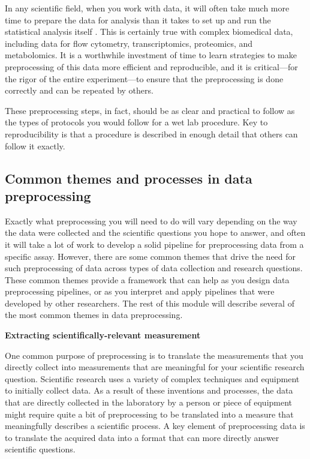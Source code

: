 \documentclass[]{tufte-book}
\begin{document}
In any scientific field, when you work with data, it will often take much more
time to prepare the data for analysis than it takes to set up and run the
statistical analysis itself \citep{robinson2014broom}. This is certainly true with
complex biomedical data, including data for flow cytometry, transcriptomics,
proteomics, and metabolomics. It is a worthwhile investment of time to learn
strategies to make preprocessing of this data more efficient and reproducible,
and it is critical---for the rigor of the entire experiment---to ensure that the
preprocessing is done correctly and can be repeated by others.

These preprocessing steps, in fact, should be as clear and practical to follow
as the types of protocols you would follow for a wet lab procedure. Key to
reproducibility is that a procedure is described in enough detail that others
can follow it exactly.

\subsection{Common themes and processes in data preprocessing}\label{common-themes-and-processes-in-data-preprocessing}

Exactly what preprocessing you will need to do will vary depending on the way the data
were collected and the scientific questions you hope to answer, and often it
will take a lot of work to develop a solid pipeline for preprocessing data from
a specific assay. However, there are some common themes that drive the need for
such preprocessing of data across types of data collection and research
questions. These common themes provide a framework that can help as you design
data preprocessing pipelines, or as you interpret and apply pipelines that were
developed by other researchers. The rest of this module will describe several of
the most common themes in data preprocessing.

\textbf{Extracting scientifically-relevant measurement}

One common purpose of preprocessing is to translate the measurements that
you directly collect into measurements that are meaningful for your scientific
research question. Scientific research uses a variety of complex techniques and
equipment to initially collect data. As a result of these inventions and
processes, the data that are directly collected in the laboratory by a person or
piece of equipment might require quite a bit of preprocessing to be translated
into a measure that meaningfully describes a scientific process. A key element
of preprocessing data is to translate the acquired data into a format that can
more directly answer scientific questions.
\end{document}
